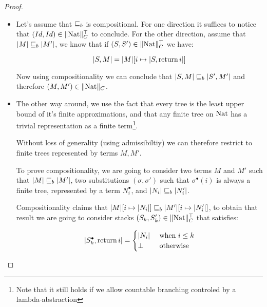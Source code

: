 \begin{proof}
    \begin{itemize}
        \item Let's assume that $\sqsubseteq_b$ is compositional. For 
            one direction it suffices to notice that
            $(Id,Id) \in \| \textnormal{Nat} \|_C^\top$ to conclude. For the other 
            direction, assume that $|M| \sqsubseteq_b |M'|$, 
            we know that if $(S,S') \in \| \textnormal{Nat} \|_C^\top$ we have:

            \begin{equation*}
                |S,M| = |M|[i \mapsto |S, \operatorname{return} i|]
            \end{equation*}

            Now using compositionality we can conclude that $|S,M| \sqsubseteq_b
            |S',M'|$ and therefore $(M,M') \in \| \textnormal{Nat} \|_C$.

        \item The other way around, we use the fact that 
            every tree is the least upper bound of it's finite approximations,
            and that any finite tree on $\textnormal{Nat}$ has a trivial representation as a 
            finite term\footnote{Note that it still holds if 
            we allow countable branching controled by a lambda-abstraction}.
            
            Without loss of generality (using admissibiltiy) we can 
            therefore restrict to finite trees represented by terms 
            $M,M'$.

            To prove compositionality, we are going to consider 
            two terms $M$ and $M'$ such that $|M| \sqsubseteq_b |M'|$, two substitutions 
            $(\sigma,\sigma')$ such that $\sigma^\bullet (i)$ is always 
            a finite tree, represented by a term $N_i^\bullet$, and 
            $|N_i| \sqsubseteq_b |N_i'|$.

            Compositionality claims that $|M|[ i \mapsto |N_i|] \sqsubseteq_b |M'|[ i
            \mapsto |N_i'|]$, to obtain that result we are going to consider 
            stacks $(S_k,S_k') \in \| \textnormal{Nat} \|_C^\top$ that satisfies:

            \begin{equation*}
                | S_k^\bullet, \operatorname{return} i | = 
                \begin{cases}
                    |N_i| & \text{ when } i \leq k \\
                    \bot  & \text{ otherwise } 
                \end{cases}
            \end{equation*}


\end{itemize}
\end{proof}
